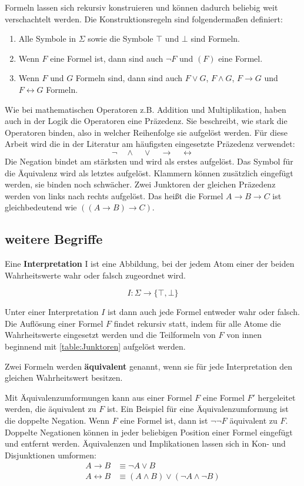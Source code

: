 Formeln lassen sich rekursiv konstruieren und können dadurch beliebig weit verschachtelt werden. Die Konstruktionsregeln sind folgendermaßen definiert:
\begin{enumerate}
	\item Alle Symbole in $\Sigma$ sowie die Symbole $\top$ und $\bot$ sind Formeln.
	\item Wenn $F$ eine Formel ist, dann sind auch $\neg F$ und $(F)$ eine Formel.
	\item Wenn $F$ und $G$ Formeln sind, dann sind auch $F \vee G$, $F \wedge G$, $F \to G$ und $F \leftrightarrow G$ Formeln.
\end{enumerate}
Wie bei mathematischen Operatoren z.B. Addition und Multiplikation, haben auch in der Logik die Operatoren eine Präzedenz. Sie beschreibt, wie stark die Operatoren binden, also in welcher Reihenfolge sie aufgelöst werden. Für diese Arbeit wird die in der Literatur am häufigsten eingesetzte Präzedenz verwendet:
$$\neg \quad \wedge \quad \vee \quad \to \quad \leftrightarrow$$
Die Negation bindet am stärksten und wird als erstes aufgelöst. Das Symbol für die Äquivalenz wird als letztes aufgelöst. Klammern können zusätzlich eingefügt werden, sie binden noch schwächer.
Zwei Junktoren der gleichen Präzedenz werden von links nach rechts aufgelöst. Das heißt die Formel $A\to B\to C$ ist gleichbedeutend wie $((A\to B)\to C)$.

\subsection{weitere Begriffe}

Eine \textbf{Interpretation} I ist eine Abbildung, bei der jedem Atom einer der beiden Wahrheitswerte wahr oder falsch zugeordnet wird. 

$$I: \Sigma\to\{\top,\bot\}$$

Unter einer Interpretation $I$ ist dann auch jede Formel entweder wahr oder falsch. Die Auflösung einer Formel $F$ findet rekursiv statt, indem für alle Atome die Wahrheitswerte eingesetzt werden und die Teilformeln von $F$ von innen beginnend mit \ref{table:Junktoren} aufgelöst werden.

Zwei Formeln werden \textbf{äquivalent} genannt, wenn sie für jede Interpretation den gleichen Wahrheitswert besitzen.

Mit Äquivalenzumformungen kann aus einer Formel $F$ eine Formel $F'$ hergeleitet werden, die äquivalent zu $F$ ist. Ein Beispiel für eine Äquivalenzumformung ist die doppelte Negation. Wenn $F$ eine Formel ist, dann ist $\neg\neg F$ äquivalent zu $F$. Doppelte Negationen können in jeder beliebigen Position einer Formel eingefügt und entfernt werden. Äquivalenzen und Implikationen lassen sich in Kon- und Disjunktionen umformen:
\begin{align*}
	A \to B &\equiv \neg A \vee B \\
	A \leftrightarrow B &\equiv (A \wedge B) \vee (\neg A \wedge \neg B)	
\end{align*}

